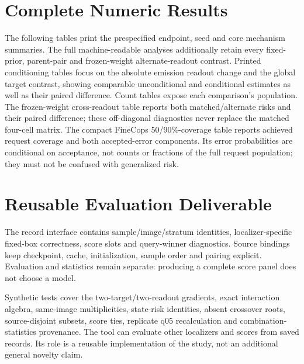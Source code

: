 \documentclass[10pt,twocolumn,letterpaper]{article}
\begin{document}
\section{Complete Numeric Results}
The following tables print the prespecified endpoint, seed and core
mechanism summaries. The full machine-readable analyses additionally
retain every fixed-prior, parent-pair and frozen-weight alternate-readout
contrast. Printed conditioning tables focus on the absolute emission
readout change and the global target contrast, showing comparable
unconditional and conditional estimates as well as their paired
difference. Count tables expose each comparison's population.
The frozen-weight cross-readout table reports both matched/alternate
risks and their paired difference; these off-diagonal diagnostics
never replace the matched four-cell matrix.
The compact FineCops 50/90\%-coverage table reports achieved request
coverage and both accepted-error components. Its error probabilities
are conditional on acceptance, not counts or fractions of the full
request population; they must not be confused with generalized risk.











\section{Reusable Evaluation Deliverable}
The record interface contains sample/image/stratum identities,
localizer-specific fixed-box correctness, score slots and query-winner
diagnostics. Source bindings keep checkpoint, cache, initialization,
sample order and pairing explicit. Evaluation and statistics remain
separate: producing a complete score panel does not choose a model.

Synthetic tests cover the two-target/two-readout gradients, exact
interaction algebra, same-image multiplicities, state-risk identities,
absent crossover roots, source-disjoint subsets, score ties,
replicate q05 recalculation and combination-statistics provenance.
The tool can evaluate other localizers and scores from saved records.
Its role is a reusable implementation of the study, not an additional
general novelty claim.

\FloatBarrier
{\small}
\end{document}
